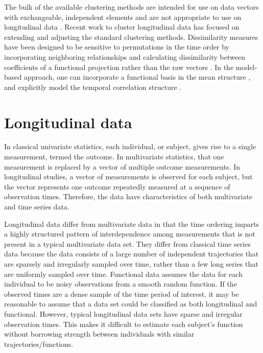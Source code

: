 The bulk of the available clustering methods are intended for use on data vectors with exchangeable, independent elements and are not appropriate to use on longitudinal data \cite{everitt2009}. Recent work to cluster longitudinal data has focused on extending and adjusting the standard clustering methods. Dissimilarity measures have been designed to be sensitive to permutations in the time order by incorporating neighboring relationships \cite{chouakria2007} and calculating dissimilarity between coefficients of a functional projection rather than the raw vectors \cite{serban2005, tarpey2003, abraham2003, tarpey2007,hitchcock2007}. In the model-based approach, one can incorporate a functional basis in the mean structure \cite{nagin1999,gaffney1999}, and explicitly model the temporal correlation structure \cite{muthen1999,fraley1999,mcnicholas2010}. 

\section{Longitudinal data}
In classical univariate statistics, each individual, or subject, gives rise to a single measurement, termed the outcome. In multivariate statistics, that one measurement is replaced by a vector of multiple outcome measurements. In longitudinal studies, a vector of measurements is observed for each subject, but the vector represents one outcome repeatedly measured at a sequence of observation times. Therefore, the data have characteristics of both multivariate and time series data.

Longitudinal data differ from multivariate data in that the time ordering imparts a highly structured pattern of interdependence among measurements that is not present in a typical multivariate data set. They differ from classical time series data because the data consists of a large number of independent trajectories that are sparsely and irregularly sampled over time, rather than a few long series that are uniformly sampled over time. Functional data \cite{ramsay2005} assumes the data for each individual to be noisy observations from a smooth random function. If the observed times are a dense sample of the time period of interest, it may be reasonable to assume that a data set could be classified as both longitudinal and functional. However, typical longitudinal data sets have sparse and irregular observation times. This makes it difficult to estimate each subject's function without borrowing strength between individuals with similar trajectories/functions.

